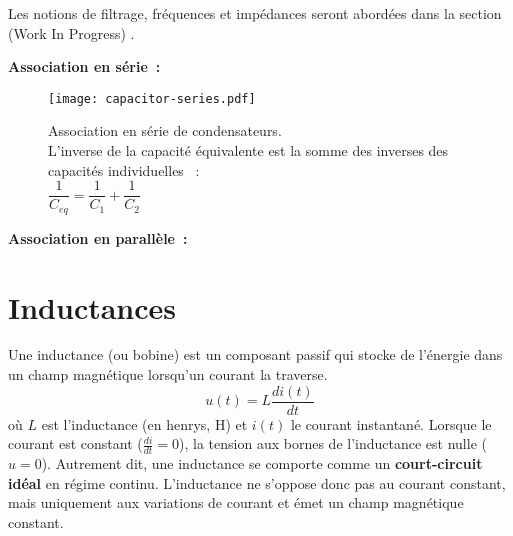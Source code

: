 \begin{Note}
	Les notions de filtrage, fr\'equences et imp\'edances seront abord\'ees dans la section (Work In Progress) .
\end{Note}
\textbf{Association en s\'erie~:}
\begin{figure}[H]
    \centering
    \texttt{[image: capacitor-series.pdf]}
    \caption{\centering
    Association en s\'erie de condensateurs.\\
    L'inverse de la capacit\'e \'equivalente est la somme des inverses des capacit\'es individuelles
    ~:\\
    \vspace{\baselineskip}
    \(\dfrac{1}{C_{eq}} = \dfrac{1}{C_1} + \dfrac{1}{C_2}\)}
\end{figure}
\textbf{Association en parall\`ele~:}
\begin{figure}[H]
\end{figure}

\section{Inductances} \label{sec:inductors}
Une inductance (ou bobine) est un composant passif qui stocke de l'\'energie dans un champ magn\'etique lorsqu'un courant la traverse.
\[
u(t) = L \frac{di(t)}{dt}
\]
où \(L\) est l'inductance (en henrys, \unit{\henry}) et \(i(t)\) le courant instantan\'e.
\vspace{\baselineskip}
Lorsque le courant est constant (\(\frac{di}{dt} = 0\)), la tension aux bornes de l'inductance est nulle (\(u = 0\)). Autrement dit, une inductance se comporte comme un \textbf{court-circuit id\'eal} en r\'egime continu. L'inductance ne s'oppose donc pas au courant constant, mais uniquement aux variations de courant et \'emet un champ magn\'etique constant.

